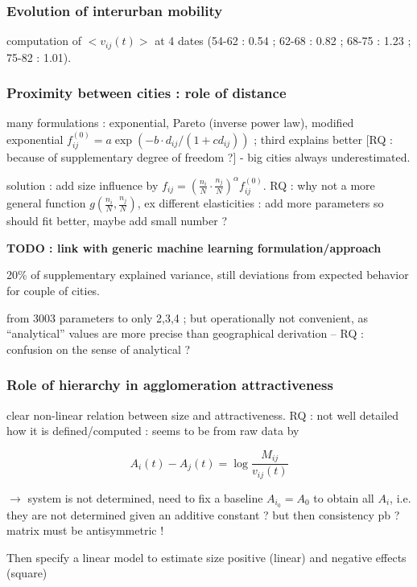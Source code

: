 \subsubsection{Evolution of interurban mobility}

computation of $<v_{ij}(t)>$ at 4 dates (54-62 : 0.54 ; 62-68 : 0.82 ; 68-75 : 1.23 ; 75-82 : 1.01).

\subsubsection{Proximity between cities : role of distance}

many formulations : exponential, Pareto (inverse power law), modified exponential $f_{ij}^{(0)} = a\exp{(-b\cdot d_{ij}/(1+c d_{ij}))}$ ; third explains better [RQ : because of supplementary degree of freedom ?] - big cities always underestimated.

solution : add size influence by $f_{ij} = \left(\frac{n_i}{N}\cdot\frac{n_j}{N}\right)^{\alpha} f_{ij}^{(0)}$. RQ : why not a more general function $g\left(\frac{n_i}{N},\frac{n_j}{N}\right)$, ex different elasticities : add more parameters so should fit better, maybe add small number ?

\textbf{TODO : link with generic machine learning formulation/approach}

20\% of supplementary explained variance, still deviations from expected behavior for couple of cities.

from 3003 parameters to only 2,3,4 ; but operationally not convenient, as ``analytical'' values are more precise than geographical derivation -- RQ : confusion on the sense of analytical ?

\subsubsection{Role of hierarchy in agglomeration attractiveness}

clear non-linear relation between size and attractiveness. RQ : not well detailed how it is defined/computed : seems to be from raw data by

\[
A_i(t) - A_j(t) = \log{\frac{M_{ij}}{v_{ij}(t)}}
\]

$\rightarrow$ system is not determined, need to fix a baseline $A_{i_0} = A_0$ to obtain all $A_i$, i.e. they are not determined given an additive constant ? but then consistency pb ? matrix must be antisymmetric !

Then specify a linear model to estimate size positive (linear) and negative effects (square)

